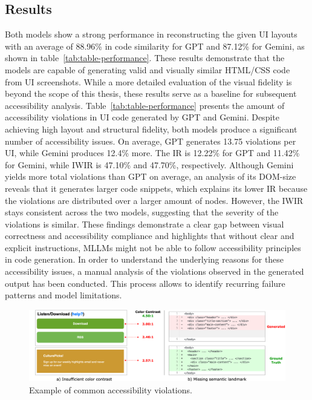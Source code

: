 \subsection{Results}
Both models show a strong performance in reconstructing the given 
UI layouts with an average of 88.96\% in code similarity
for GPT and 87.12\% for Gemini, as shown in table~\ref{tab:table-performance}.
These results demonstrate that the models are capable of generating 
valid and visually similar HTML/CSS code from UI screenshots. 
While a more detailed evaluation of the visual fidelity is beyond 
the scope of this thesis, these results serve as a baseline 
for subsequent accessibility analysis.
Table~\ref{tab:table-performance} presents the amount of accessibility 
violations in UI code generated by GPT and Gemini. Despite 
achieving high layout and structural fidelity, both models produce 
a significant number of accessibility issues. On average, GPT 
generates 13.75 violations per UI, while Gemini produces 12.4\% 
more. The IR is 12.22\% for GPT and 11.42\% for Gemini,
while IWIR is 47.10\% and 47.70\%, respectively. Although Gemini yields
more total violations than GPT on average, an analysis of its DOM-size 
reveals that it generates larger code snippets, which explains
its lower IR because the violations are distributed over a larger 
amount of nodes. However, the IWIR stays consistent across the two models, 
suggesting that the severity of the violations is similar.
These findings demonstrate a clear gap between visual correctness and 
accessibility compliance and highlights that without clear and 
explicit instructions, MLLMs might not be able to follow 
accessibility principles in code generation. In order to understand 
the underlying reasons for these accessibility issues, a manual 
analysis of the violations observed in the generated output
has been conducted. This process allows to identify recurring 
failure patterns and model limitations.

\begin{figure}
  \centering
  \includegraphics[width=0.9\linewidth]{figures/colorcontrastlandmarkexample.png}
  \caption{Example of common accessibility violations.}
  \label{fig:common} 
\end{figure}

